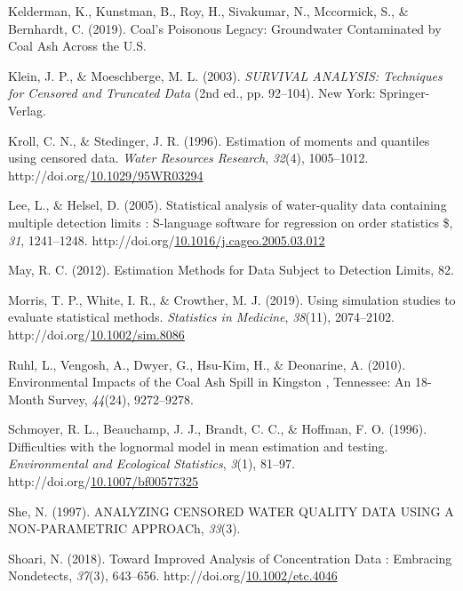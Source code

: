 \documentclass[12pt, twoside]{amherstthesis}
\newenvironment{CSLReferences}%
  {}%
  {\par}
\begin{document}
\begin{CSLReferences}{1}{0}
\leavevmode\hypertarget{ref-Kelderman2019}{}%
Kelderman, K., Kunstman, B., Roy, H., Sivakumar, N., Mccormick, S., \& Bernhardt, C. (2019). {Coal's Poisonous Legacy: Groundwater Contaminated by Coal Ash Across the U.S.}

\leavevmode\hypertarget{ref-Klein2003}{}%
Klein, J. P., \& Moeschberge, M. L. (2003). \emph{{SURVIVAL ANALYSIS: Techniques for Censored and Truncated Data}} (2nd ed., pp. 92--104). New York: Springer-Verlag.

\leavevmode\hypertarget{ref-Kroll1996}{}%
Kroll, C. N., \& Stedinger, J. R. (1996). {Estimation of moments and quantiles using censored data}. \emph{Water Resources Research}, \emph{32}(4), 1005--1012. http://doi.org/\href{https://doi.org/10.1029/95WR03294}{10.1029/95WR03294}

\leavevmode\hypertarget{ref-Lee2005}{}%
Lee, L., \& Helsel, D. (2005). {Statistical analysis of water-quality data containing multiple detection limits : S-language software for regression on order statistics {\$}}, \emph{31}, 1241--1248. http://doi.org/\href{https://doi.org/10.1016/j.cageo.2005.03.012}{10.1016/j.cageo.2005.03.012}

\leavevmode\hypertarget{ref-May2012}{}%
May, R. C. (2012). {Estimation Methods for Data Subject to Detection Limits}, 82.

\leavevmode\hypertarget{ref-Morris2019}{}%
Morris, T. P., White, I. R., \& Crowther, M. J. (2019). {Using simulation studies to evaluate statistical methods}. \emph{Statistics in Medicine}, \emph{38}(11), 2074--2102. http://doi.org/\href{https://doi.org/10.1002/sim.8086}{10.1002/sim.8086}

\leavevmode\hypertarget{ref-Ruhl2010}{}%
Ruhl, L., Vengosh, A., Dwyer, G., Hsu-Kim, H., \& Deonarine, A. (2010). {Environmental Impacts of the Coal Ash Spill in Kingston , Tennessee: An 18-Month Survey}, \emph{44}(24), 9272--9278.

\leavevmode\hypertarget{ref-Schmoyer1996}{}%
Schmoyer, R. L., Beauchamp, J. J., Brandt, C. C., \& Hoffman, F. O. (1996). {Difficulties with the lognormal model in mean estimation and testing}. \emph{Environmental and Ecological Statistics}, \emph{3}(1), 81--97. http://doi.org/\href{https://doi.org/10.1007/bf00577325}{10.1007/bf00577325}

\leavevmode\hypertarget{ref-She1997}{}%
She, N. (1997). {ANALYZING CENSORED WATER QUALITY DATA USING A NON-PARAMETRIC APPROACh}, \emph{33}(3).

\leavevmode\hypertarget{ref-Shoari2018}{}%
Shoari, N. (2018). {Toward Improved Analysis of Concentration Data : Embracing Nondetects}, \emph{37}(3), 643--656. http://doi.org/\href{https://doi.org/10.1002/etc.4046}{10.1002/etc.4046}


\end{CSLReferences}
\end{document}
